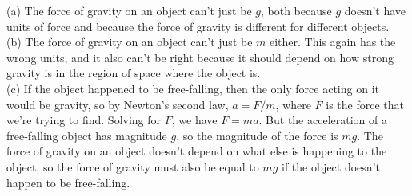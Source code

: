 (a) The force of gravity on an object can't just be $g$, both because
$g$ doesn't have units of force and because the force of gravity is
different for different objects.\\
(b) The force of gravity on an object can't just be $m$ either.
This again has the wrong units, and it also can't be right because
it should depend on how strong gravity is in the region of space
where the object is.\\
(c) If the object happened to be free-falling, then the only force
acting on it would be gravity, so by Newton's second law,
$a=F/m$, where $F$ is the force that we're trying to find.
Solving for $F$, we have $F=ma$. But the acceleration of a free-falling
object has magnitude $g$, so the magnitude of the force is $mg$.
The force of gravity on an object doesn't depend on what else is
happening to the object, so the force of gravity must also be equal to $mg$
if the object doesn't happen to be free-falling.
